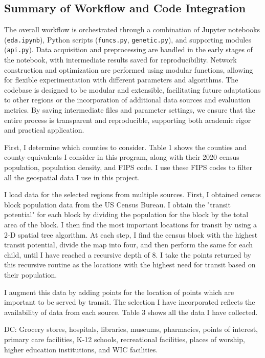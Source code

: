 \documentclass[manuscript,screen,review]{acmart}
\begin{document}
\subsection{Summary of Workflow and Code Integration}
The overall workflow is orchestrated through a combination of Jupyter notebooks (\texttt{eda.ipynb}), Python scripts (\texttt{funcs.py}, \texttt{genetic.py}), and supporting modules (\texttt{api.py}). Data acquisition and preprocessing are handled in the early stages of the notebook, with intermediate results saved for reproducibility. Network construction and optimization are performed using modular functions, allowing for flexible experimentation with different parameters and algorithms. The codebase is designed to be modular and extensible, facilitating future adaptations to other regions or the incorporation of additional data sources and evaluation metrics. By saving intermediate files and parameter settings, we ensure that the entire process is transparent and reproducible, supporting both academic rigor and practical application.



First, I determine which counties to consider. Table 1 shows the counties and county-equivalents I consider in this program, along with their 2020 census population, population density, and FIPS code. I use these FIPS codes to filter all the geospatial data I use in this project.

I load data for the selected regions from multiple sources. First, I obtained census block population data from the US Census Bureau. I obtain the "transit potential" for each block by dividing the population for the block by the total area of the block. I then find the most important locations for transit by using a 2-D spatial tree algorithm. At each step, I find the census block with the highest transit potential, divide the map into four, and then perform the same for each child, until I have reached a recursive depth of 8. I take the points returned by this recursive routine as the locations with the highest need for transit based on their population. 

I augment this data by adding points for the location of points which are important to be served by transit. The selection I have incorporated reflects the availability of data from each source. Table 3 shows all the data I have collected.

DC: Grocery stores, hospitals, libraries, museums, pharmacies, points of interest, primary care facilities, K-12 schools, recreational facilities, places of worship, higher education institutions, and WIC facilities. 
\end{document}

